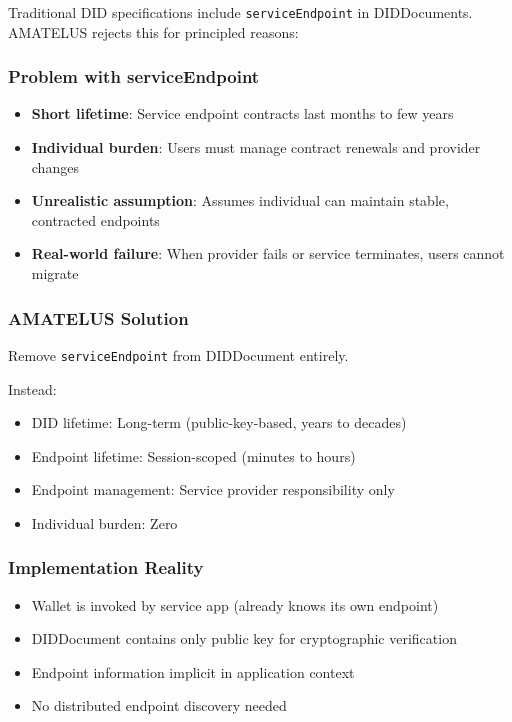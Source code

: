 Traditional DID specifications include \texttt{serviceEndpoint} in DIDDocuments. AMATELUS rejects this for principled reasons:

\subsubsection{Problem with serviceEndpoint}

\begin{itemize}
  \item \textbf{Short lifetime}: Service endpoint contracts last months to few years
  \item \textbf{Individual burden}: Users must manage contract renewals and provider changes
  \item \textbf{Unrealistic assumption}: Assumes individual can maintain stable, contracted endpoints
  \item \textbf{Real-world failure}: When provider fails or service terminates, users cannot migrate
\end{itemize}

\subsubsection{AMATELUS Solution}

Remove \texttt{serviceEndpoint} from DIDDocument entirely.

Instead:
\begin{itemize}
  \item DID lifetime: Long-term (public-key-based, years to decades)
  \item Endpoint lifetime: Session-scoped (minutes to hours)
  \item Endpoint management: Service provider responsibility only
  \item Individual burden: Zero
\end{itemize}

\subsubsection{Implementation Reality}

\begin{itemize}
  \item Wallet is invoked by service app (already knows its own endpoint)
  \item DIDDocument contains only public key for cryptographic verification
  \item Endpoint information implicit in application context
  \item No distributed endpoint discovery needed
\end{itemize}

